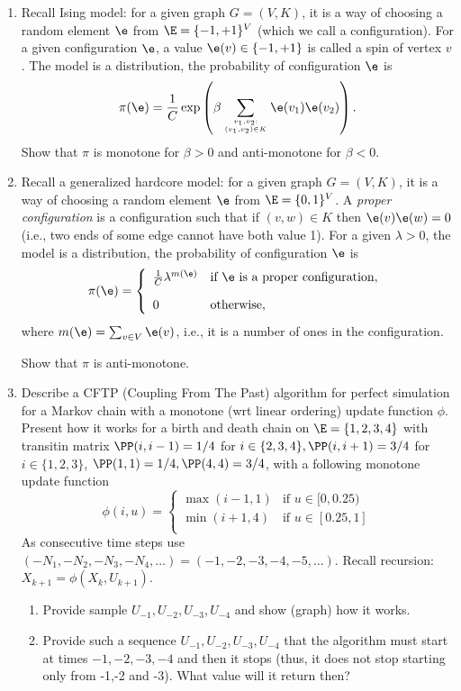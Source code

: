 \documentclass[a4paper,12pt]{article}
\begin{document}
\begin{enumerate}
 \item Recall Ising model: for a given graph $G=(V,K)$, it is a way 
 of choosing a random element $\e$ from $\E=\{-1,+1\}^V$ (which we call a configuration).
 For a given configuration $\e$, a value $\e(v)\in\{-1,+1\}$ is called a spin of vertex $v$.
 The model is a distribution, the probability of configuration $\e$ is 
 $$\pi(\e)={1\over C} \exp\left(\beta \sum_{v_1, v_2: \atop (v_1,v_2)\in K} \e(v_1)\e(v_2)\right).$$
 Show that $\pi$ is monotone for $\beta>0$ and anti-monotone for $\beta<0$.
 
 \item 
 Recall a generalized hardcore model: for a given graph $G=(V,K)$, it is a way 
 of choosing a random element $\e$ from $\E=\{0,1\}^V$. A \textsl{proper configuration} 
 is a configuration such that if $(v,w)\in K$ then $\e(v)\e(w)=0$ (i.e.,
 two ends of some edge cannot have both value 1). For a given $\lambda>0$, the model 
 is a distribution, the probability of configuration $\e$ is 
 $$\pi(\e)=
 \left\{ 
 \begin{array}{llll}
  {1\over C} \lambda^{m(\e)} & \textrm {if } \e \textrm{ is a proper configuration},\\[10pt]
  0 & \textrm{otherwise},
 \end{array}
 \right. 
 $$
 where $m(\e)=\sum_{v\in V}\e(v)$, i.e., it is a number of ones in the configuration.
 \smallskip\par 
 Show that $\pi$ is anti-monotone.
 
  
  \item Describe
a  CFTP (Coupling From The Past) algorithm for perfect simulation
for a Markov chain with a monotone (wrt linear ordering) update function  $\phi$.
Present how it works for a birth and death chain on $\E=\{1,2,3,4\}$
with transitin matrix  $\PP(i,i-1)=1/4$ for $i\in\{2,3,4\}, \PP(i,i+1)=3/4$
for  $i\in\{1,2,3\}$, $\PP(1,1)=1/4, \PP(4,4)=3/4$,
with a following monotone update function
$$
\phi(i,u)=\left\{\begin{array}{lll}
 \max(i-1,1) & \textrm{if\ }  u\in [0,0.25) \\[7pt]
 \min(i+1,4) & \textrm{if\ }  u\in [0.25,1] \\[7pt]
\end{array}\right.
$$
As consecutive time steps use $(-N_1, -N_2, -N_3, -N_4,\ldots)=(-1,-2,-3,-4,-5,\ldots)$.
Recall recursion: $X_{k+1}=\phi(X_k,U_{k+1})$.
\begin{enumerate}
\item Provide sample  $ U_{-1}, U_{-2}, U_{-3}, U_{-4}$ and
show (graph) how it works.
\item Provide such a sequence  $ U_{-1}, U_{-2}, U_{-3}, U_{-4}$
that the algorithm must start at times $-1, -2, -3, -4$
and then it stops (thus, it does not stop starting only from -1,-2 and -3).
What value will it return then?


\end{enumerate}
\end{enumerate}
\end{document}
